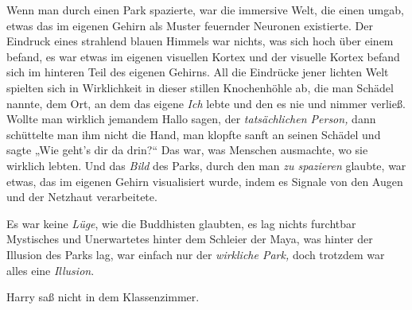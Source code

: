 Wenn man durch einen Park spazierte, war die immersive Welt, die einen umgab, etwas das im eigenen Gehirn als Muster feuernder Neuronen existierte. Der Eindruck eines strahlend blauen Himmels war nichts, was sich hoch über einem befand, es war etwas im eigenen visuellen Kortex und der visuelle Kortex befand sich im hinteren Teil des eigenen Gehirns. All die Eindrücke jener lichten Welt spielten sich in Wirklichkeit in dieser stillen Knochenhöhle ab, die man Schädel nannte, dem Ort, an dem das eigene \emph{Ich} lebte und den es nie und nimmer verließ. Wollte man wirklich jemandem Hallo sagen, der \emph{tatsächlichen Person,} dann schüttelte man ihm nicht die Hand, man klopfte sanft an seinen Schädel und sagte
„Wie geht’s dir da drin?“ Das war, was Menschen ausmachte, wo sie wirklich lebten. Und das \emph{Bild} des Parks, durch den man \emph{zu spazieren} glaubte, war etwas, das im eigenen Gehirn visualisiert wurde, indem es Signale von den Augen und der Netzhaut verarbeitete.

Es war keine \emph{Lüge}, wie die Buddhisten glaubten, es lag nichts furchtbar Mystisches und Unerwartetes hinter dem Schleier der Maya, was hinter der Illusion des Parks lag, war einfach nur der \emph{wirkliche Park,} doch trotzdem war alles eine \emph{Illusion}.

Harry saß nicht in dem Klassenzimmer.

